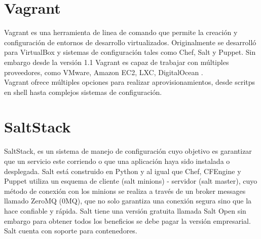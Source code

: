 \section{Vagrant}
Vagrant es una herramienta de linea de comando que permite la creación y configuración de entornos de desarrollo virtualizados. Originalmente se desarrolló para VirtualBox y sistemas de configuración tales como Chef, Salt y Puppet. Sin embargo desde la versión 1.1 Vagrant es capaz de trabajar con múltiples proveedores, como VMware, Amazon EC2, LXC, DigitalOcean \cite{Vag15}.
\\
Vagrant ofrece múltiples opciones para realizar aprovisionamientos, desde scritps en shell hasta complejos sistemas de configuración.

\section{SaltStack}
SaltStack, es un sistema de manejo de configuración cuyo objetivo es garantizar que un servicio este corriendo o que una aplicación haya sido instalada o desplegada. Salt está construido en Python y al igual que Chef, CFEngine y Puppet utiliza un esquema de cliente (salt minions) - servidor (salt master), cuyo método de conexión con los minions se realiza a través de un broker messages llamado ZeroMQ (0MQ), que no solo garantiza una conexión segura sino que la hace confiable y rápida. Salt tiene una versión gratuita llamada Salt Open sin embargo para obtener todos los beneficios se debe pagar la versión empresarial. Salt cuenta con soporte para contenedores. \cite{Salt15}
